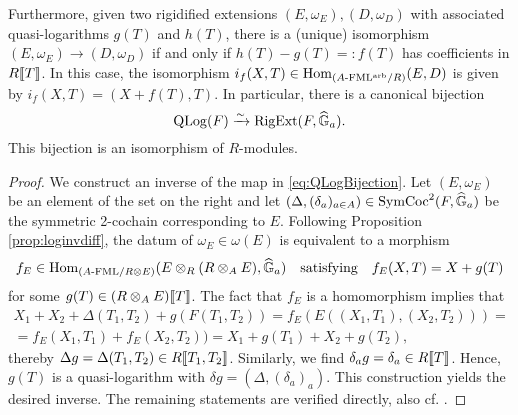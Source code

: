 \documentclass[../main.tex]{subfiles}
\begin{document}
\begin{thm}
Furthermore, given two rigidified extensions
$(E, \omega_E), (D, \omega_{D})$ with associated quasi-logarithms
$g(T)$ and $h(T)$, there is a (unique) isomorphism $(E, \omega_E) \to (D, \omega_{D})$
if and only if $h(T)-g(T) =\colon  f(T)$ has coefficients in $R\llbracket T \rrbracket$. 
In this case, the isomorphism $i_f(X,T) \in \operatorname{Hom}_{{({A}\text-\allowbreak\mathrm{FML^{arb}}/{R})}}(E, D)$ is
given by $i_f(X,T) = (X+f(T), T)$. In particular, there is a canonical bijection
\begin{equation*}
  \operatorname {QLog}(F) \xrightarrow{\sim} \operatorname {RigExt}(F, \widehat{\mathbb{G}}_a).
\end{equation*}
This bijection is an isomorphism of $R$-modules.
\begin{proof}[Proof]
  We construct an inverse of the map in \eqref{eq:QLogBijection}. Let $(E,
  \omega_E)$ be an element of the set on the right
  and let $(\Delta, (\delta_a)_{a \in A}) \in
  \operatorname{SymCoc}^2(F, \widehat{\mathbb{G}}_a)$ be the symmetric 2-cochain corresponding to $E$.
  Following Proposition \ref{prop:loginvdiff}, the datum of 
  $\omega_E \in \omega(E)$ is equivalent to a morphism 
  $$f_E \in \operatorname{Hom}_{{({A}\text-\allowbreak\mathrm{FML}/{R \otimes E})}}(E \otimes_R (R \otimes_A E), \widehat{\mathbb{G}}_a)
  \quad \text{satisfying} \quad f_E(X,T) = X + g(T)$$
  for some $g(T) \in (R \otimes_A E)\llbracket T \rrbracket$. The fact that 
  $f_E$ is a homomorphism implies that 
  \begin{multline*}
    X_1 + X_2 + \Delta(T_1, T_2) + g(F(T_1,T_2)) = f_E(E((X_1, T_1), (X_2, T_2))) = \\
    = f_E(X_1, T_1) + f_E(X_2, T_2)) = X_1 + g(T_1) + X_2 + g(T_2),
  \end{multline*}
  thereby $\Delta g = \Delta(T_1, T_2) \in R\llbracket T_1, T_2\rrbracket$. Similarly, 
  we find $\delta_a g = \delta_a \in R\llbracket T \rrbracket$. Hence, $g(T)$ is a
  quasi-logarithm with $\delta g = (\Delta, (\delta_a)_a)$. 
  This construction yields the desired inverse.
  The remaining statements are verified directly, also cf. \cite[Section
  8]{hopkins1994equivariant}.
\end{proof}
\end{thm}
\end{document}
